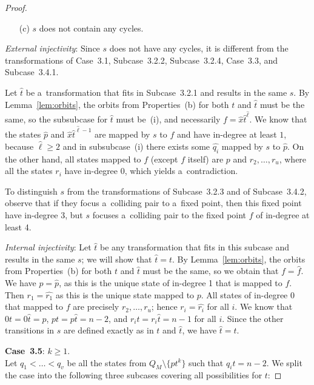 \documentclass{amsart}
\renewcommand{\ge}{\geqslant}
\newcommand{\e}[1]{\hat{#1}}
\begin{document}
\begin{proof}
\begin{enumerate}
\item[(c)] $s$ does not contain any cycles.
\end{enumerate}

\textit{External injectivity}:
Since $s$ does not have any cycles, it is different from the transformations of Case~3.1, Subcase~3.2.2, Subcase~3.2.4, Case~3.3, and Subcase~3.4.1.

Let $\e{t}$ be a~transformation that fits in Subcase~3.2.1 and results in the same $s$.
By Lemma~\ref{lem:orbits}, the orbits from Properties~(b) for both $t$ and $\e{t}$ must be the same, so the subsubcase for $\e{t}$ must be~(i), and necessarily $f = \e{x}\e{t}^{\e{\ell}}$.
We know that the states $\e{p}$ and $\e{x}\e{t}^{\e{\ell}-1}$ are mapped by $s$ to $f$ and have in-degree at least $1$, because $\hat{\ell} \ge 2$ and in subsubcase~(i) there exists some $\e{q_i}$ mapped by $s$ to $\e{p}$.
On the other hand, all states mapped to $f$ (except $f$ itself) are $p$ and $r_2,\ldots,r_u$, where all the states $r_i$ have in-degree 0, which yields a~contradiction.

To distinguish $s$ from the transformations of Subcase~3.2.3 and of Subcase~3.4.2, observe that if they focus a~colliding pair to a~fixed point, then this fixed point have in-degree 3, but $s$ focuses a~colliding pair to the fixed point $f$ of in-degree at least 4.

\textit{Internal injectivity}:
Let $\e{t}$ be any transformation that fits in this subcase and results in the same $s$; we will show that $\e{t}=t$.
By Lemma~\ref{lem:orbits}, the orbits from Properties~(b) for both $t$ and $\e{t}$ must be the same, so we obtain that $f=\e{f}$.
We have $p = \e{p}$, as this is the unique state of in-degree 1 that is mapped to $f$.
Then $r_1 = \e{r_1}$ as this is the unique state mapped to $p$.
All states of in-degree 0 that mapped to $f$ are precisely $r_2,\ldots,r_u$; hence $r_i = \e{r_i}$ for all $i$.
We know that $0t = 0\e{t} = p$, $pt = p\e{t} = n-2$, and $r_i t = r_i \e{t} = n-1$ for all $i$.
Since the other transitions in $s$ are defined exactly as in $t$ and $\e{t}$, we have $\e{t} = t$.

\textbf{Case~3.5}: $k \ge 1$.\\
Let $q_1 < \ldots < q_v$ be all the states from $Q_M \setminus \{pt^k\}$ such that $q_i t = n-2$.
We split the case into the following three subcases covering all possibilities for $t$:


\end{proof}
\end{document}
